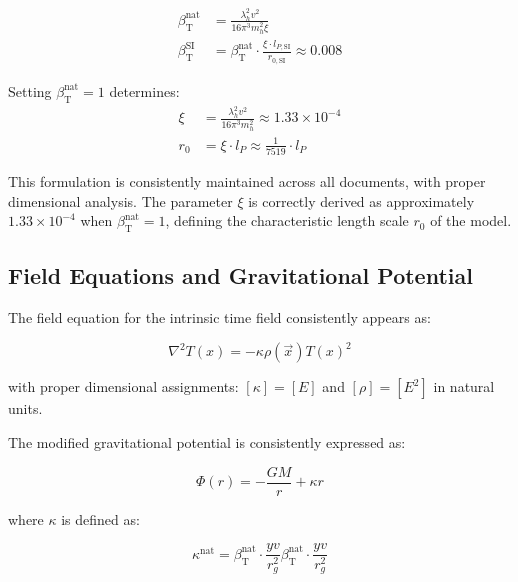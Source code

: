 \documentclass[a4paper,11pt]{article}
\newcommand{\Tfield}{T(x)}
\newcommand{\betaT}{\beta_{\text{T}}}
\newcommand{\vecx}{\vec{x}}
\begin{document}
	\begin{tcolorbox}[colback=blue!5!white, colframe=blue!75!black, title=$\betaT$ Parameter Formulation]
		\begin{align}
			\betaT^{\text{nat}} &= \frac{\lambda_h^2 v^2}{16\pi^3 m_h^2 \xi} \\
			\betaT^{\text{SI}} &= \betaT^{\text{nat}} \cdot \frac{\xi \cdot l_{P,\text{SI}}}{r_{0,\text{SI}}} \approx 0.008
		\end{align}
		
		Setting $\betaT^{\text{nat}} = 1$ determines:
		\begin{align}
			\xi &= \frac{\lambda_h^2 v^2}{16\pi^3 m_h^2} \approx 1.33 \times 10^{-4} \\
			r_0 &= \xi \cdot l_P \approx \frac{1}{7519} \cdot l_P
		\end{align}
	\end{tcolorbox}
	
	This formulation is consistently maintained across all documents, with proper dimensional analysis. The parameter $\xi$ is correctly derived as approximately $1.33 \times 10^{-4}$ when $\betaT^{\text{nat}} = 1$, defining the characteristic length scale $r_0$ of the model.
	
	\subsection{Field Equations and Gravitational Potential}
	
	The field equation for the intrinsic time field consistently appears as:
	
	\begin{equation}
		\nabla^2 \Tfield = -\kappa \rho(\vecx) \Tfield^2
	\end{equation}
	
	with proper dimensional assignments: $[\kappa] = [E]$ and $[\rho] = [E^2]$ in natural units.
	
	The modified gravitational potential is consistently expressed as:
	
	\begin{equation}
		\Phi(r) = -\frac{GM}{r} + \kappa r
	\end{equation}
	
	where $\kappa$ is defined as:
	
	\begin{equation}
		\kappa^{\text{nat}} = \betaT^{\text{nat}} \cdot \frac{yv}{r_g^2}\betaT^{\text{nat}} \cdot \frac{yv}{r_g^2}
	\end{equation}
	
\end{document}
